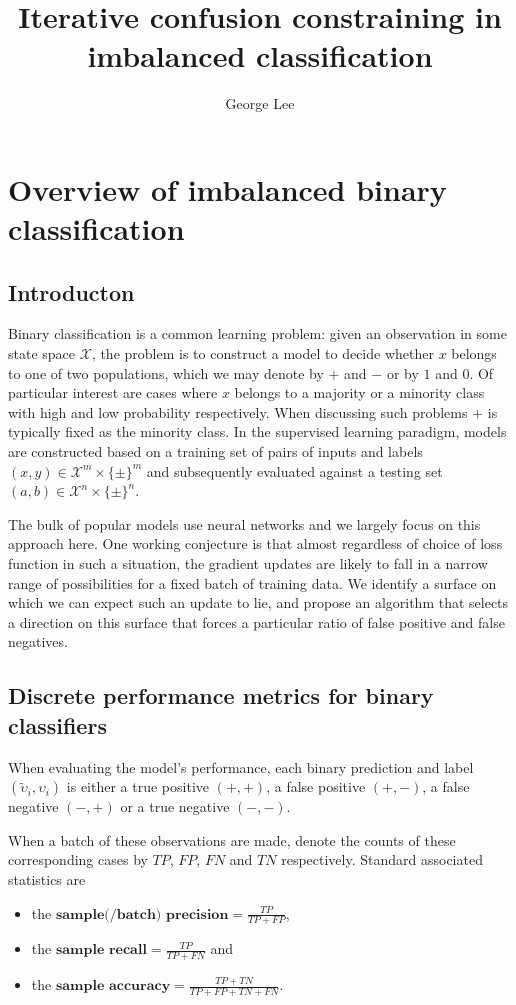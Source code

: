 \documentclass[10pt,a4paper]{article}
\title{Iterative confusion constraining in imbalanced classification}
\author{George Lee}
\begin{document}
\maketitle
\section{Overview of imbalanced binary classification}
\subsection{Introducton}
Binary classification is a common learning problem:
given an observation in some state space $\mathcal X$, the problem is to construct a model to decide whether $x$ belongs to one of two populations, which we may denote by $+$ and $-$ or by $1$ and $0$.
Of particular interest are cases where $x$ belongs to a majority or a minority class with high and low probability respectively.
When discussing such problems $+$ is typically fixed as the minority class.
In the supervised learning paradigm, models are constructed based on a training set of pairs of inputs and labels $(x,y)\in\mathcal X^m\times\{\pm\}^m$ and subsequently evaluated against a testing set $(a,b)\in\mathcal X^n\times\{\pm\}^n$.

The bulk of popular models use neural networks and we largely focus on this approach here.
One working conjecture is that almost regardless of choice of loss function in such a situation, the gradient updates are likely to fall in a narrow range of possibilities for a fixed batch of training data.
We identify a surface on which we can expect such an update to lie, and propose an algorithm that selects a direction on this surface that forces a particular ratio of false positive and false negatives.
\subsection{Discrete performance metrics for binary classifiers}
When evaluating the model's performance, each binary prediction and label $(\widetilde\upsilon_i,\upsilon_i)$ is either a true positive $(+,+)$, a false positive $(+,-)$, a false negative $(-,+)$ or a true negative $(-,-)$.

When a batch of these observations are made, denote the counts of these corresponding cases by $TP$, $FP$, $FN$ and $TN$ respectively.
Standard associated statistics are
\begin{itemize}
  \item the $\textbf{sample(/batch) precision}=\frac{TP}{TP+FP}$,
  \item the $\textbf{sample recall}=\frac{TP}{TP+FN}$ and
  \item the $\textbf{sample accuracy}=\frac{TP+TN}{TP+FP+TN+FN}$.
\end{itemize}
\end{document}
